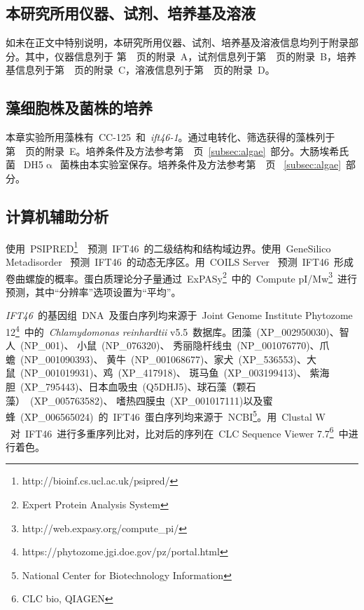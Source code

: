 \subsection{本研究所用仪器、试剂、培养基及溶液}
如未在正文中特别说明，本研究所用仪器、试剂、培养基及溶液信息均列于附录部分。其中，仪器信息列于
第\ \pageref{appen:A}\ 页的附录\ A，试剂信息列于第\ \pageref{appen:B}\ 页的附录\ B，培养基信息列于第\ \pageref{appen:C}\ 页的附录\ C，溶液信息列于第\ \pageref{appen:D}\ 页的附录\ D。

\subsection{藻细胞株及菌株的培养}
本章实验所用藻株有\ CC-125\ 和\ \textit{ift46-1}。通过电转化、筛选获得的藻株列于第\ \pageref{appen:E}\ 页的附录\ E。培养条件及方法参考第\
\pageref{subsec:algae}\ 页\ \ref{subsec:algae}\ 部分。大肠埃希氏菌
\ DH5$\upalpha$\ 菌株由本实验室保存。培养条件及方法参考第\ \pageref{subsec:algae}\ 页
\ \ref{subsec:algae}\ 部分。

\subsection{计算机辅助分析}
使用\ PSIPRED\footnote{http://bioinf.cs.ucl.ac.uk/psipred/}\ \citep{Buchan2013,Jones1999,Bryson2005,Buchan2010,McGuffin2000}\ 预测\ IFT46\ 的二级结构和结构域边界。使用\ GeneSilico Metadisorder \citep{Kozlowski2012}\ 预测\ IFT46\ 的动态无序区。用\ COILS Server \citep{Lupas1991}\ 预测\ IFT46\ 形成卷曲螺旋的概率。蛋白质理论分子量通过\ ExPASy\footnote{Expert Protein Analysis System}\ 中的\ Compute pI/Mw\footnote{http://web.expasy.org/compute\_pi/}\ 进行预测，其中“分辨率”选项设置为“平均”。

\textit{IFT46}\ 的基因组\ DNA\ 及蛋白序列均来源于\ Joint Genome Institute Phytozome 12\footnote{https://phytozome.jgi.doe.gov/pz/portal.html}\ 中的\
\textit{Chlamydomonas reinhardtii} v5.5\ 数据库。团藻\ (XP\_002950030)、智人\ (NP\_001)、 小鼠\ (NP\_076320)、 秀丽隐杆线虫\ (NP\_001076770)、爪蟾\ (NP\_001090393)、 黄牛\ (NP\_001068677)、家犬\ (XP\_536553)、大鼠\ (NP\_001019931)、鸡\ (XP\_417918)、 斑马鱼\ (XP\_003199413)、 紫海胆\ (XP\_795443)、日本血吸虫\ (Q5DHJ5)、球石藻（颗石藻）\ (XP\_005763582)、 嗜热四膜虫\ (XP\_001017111)以及蜜蜂\ (XP\_006565024)\ 的\ IFT46\ 蛋白序列均来源于\ NCBI\footnote{National Center for Biotechnology Information}。用\ Clustal W \citep{Larkin2007}\ 对\ IFT46\ 进行多重序列比对，比对后的序列在\ CLC Sequence Viewer 7.7\footnote{CLC bio, QIAGEN}\ 中进行着色。

